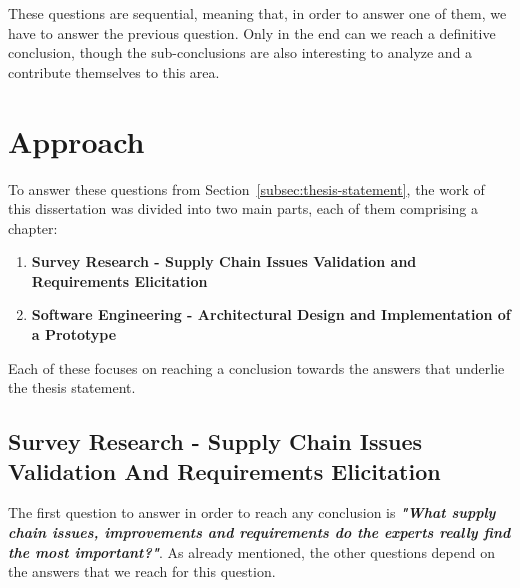 
These questions are sequential, meaning that, in order to answer one of them, we have to answer the previous question. Only in the end can we reach a definitive conclusion, though the sub-conclusions are also interesting to analyze and a contribute themselves to this area.


\section{Approach}


To answer these questions from Section~\ref{subsec:thesis-statement}, the work of this dissertation was divided into two main parts, each of them comprising a chapter:
\begin{enumerate}
\item \textbf{Survey Research - Supply Chain Issues Validation and Requirements Elicitation}
\item \textbf{Software Engineering - Architectural Design and Implementation of a Prototype}
\end{enumerate}


Each of these focuses on reaching a conclusion towards the answers that underlie the thesis statement.

\subsection{Survey Research - Supply Chain Issues Validation And Requirements Elicitation}
\label{sec:survey-approach}
The first question to answer in order to reach any conclusion is \textbf{\textit{"What supply chain issues, improvements and requirements do the experts really find the most important?"}}. As already mentioned, the other questions depend on the answers that we reach for this question.

